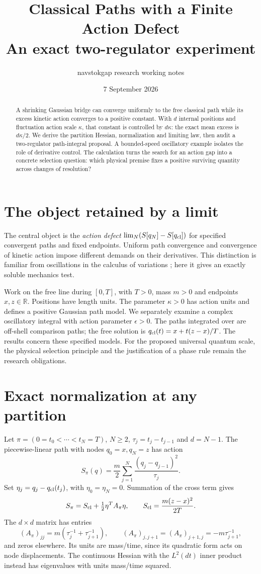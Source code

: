 \documentclass[11pt,a4paper]{article}
\title{Classical Paths with a Finite Action Defect\\
\large An exact two-regulator experiment}
\author{navstokgap research working notes}
\date{7 September 2026}
\newcommand{\R}{\mathbb R}
\begin{document}
\maketitle
\begin{abstract}
A shrinking Gaussian bridge can converge uniformly to the free classical path
while its excess kinetic action converges to a positive constant. With $d$
internal positions and fluctuation action scale $\kappa$, that constant is
controlled by $d\kappa$: the exact mean excess is $d\kappa/2$.
We derive the partition Hessian, normalization and limiting law, then audit a
two-regulator path-integral proposal. A bounded-speed oscillatory example
isolates the role of derivative control. The calculation turns the search for
an action gap into a concrete selection question: which physical premise
fixes a positive surviving quantity across changes of resolution?
\end{abstract}

\section{The object retained by a limit}
The central object is the \emph{action defect}
$\lim_N(S[q_N]-S[q_{\rm cl}])$ for specified convergent paths and fixed
endpoints. Uniform path convergence and convergence of kinetic action impose
different demands on their derivatives. This distinction is familiar from
oscillations in the calculus of variations \cite[\S\S2.1,3.3]{Rindler2017};
here it gives an exactly soluble mechanics test.

Work on the free line during $[0,T]$, with $T>0$, mass $m>0$ and endpoints
$x,z\in\R$. Positions have length units. The parameter $\kappa>0$ has action
units and defines a positive Gaussian path model. We separately examine a
complex oscillatory integral with action parameter $\epsilon>0$.
The paths integrated over are off-shell comparison paths; the free solution
is $q_{\rm cl}(t)=x+t(z-x)/T$. The results concern these specified models.
For the proposed universal quantum scale, the physical selection principle
and the justification of a phase rule remain the research obligations.

\section{Exact normalization at any partition}
Let $\pi=(0=t_0<\cdots<t_N=T)$, $N\ge2$, $\tau_j=t_j-t_{j-1}$ and
$d=N-1$. The piecewise-linear path with nodes $q_0=x,q_N=z$ has action
\[
 S_\pi(q)=\frac m2\sum_{j=1}^N\frac{(q_j-q_{j-1})^2}{\tau_j}.
\]
Set $\eta_j=q_j-q_{\rm cl}(t_j)$, with $\eta_0=\eta_N=0$. Summation of
the cross term gives
\begin{equation}\label{eq:split}
 S_\pi=S_{\rm cl}+\tfrac12\eta^TA_\pi\eta,
 \qquad S_{\rm cl}=\frac{m(z-x)^2}{2T}.
\end{equation}
The $d\times d$ matrix has entries
\[
 (A_\pi)_{jj}=m(\tau_j^{-1}+\tau_{j+1}^{-1}),\qquad
 (A_\pi)_{j,j+1}=(A_\pi)_{j+1,j}=-m\tau_{j+1}^{-1},
\]
and zeros elsewhere. Its units are mass/time, since its quadratic form acts
on node displacements. The continuous Hessian with the $L^2(dt)$ inner product
instead has eigenvalues with units mass/time squared.
\end{document}
